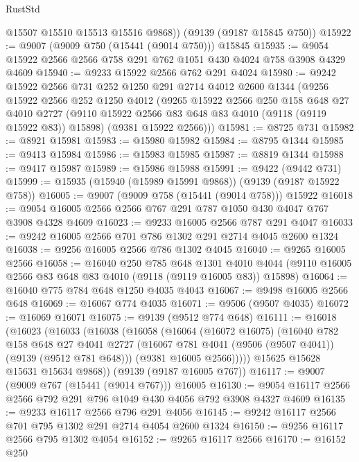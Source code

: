 \begin{lexlean}{RustStd}
\begin{coremodule}
        @15507
        @15510
        @15513
        @15516
        @9868))
    (@9139 (@9187 @15845 @750))
@15922 := @9007 (@9009 @750 (@15441 (@9014 @750))) @15845
@15935 := @9054 @15922 @2566 @2566 @758 @291 @762 @1051 @430 @4024 @758 @3908 @4329 @4609
@15940 := @9233 @15922 @2566 @762 @291 @4024
@15980 := @9242
    @15922
    @2566
    @731
    @252
    @1250
    @291
    @2714
    @4012
    @2600
    @1344
    (@9256
      @15922
      @2566
      @252
      @1250
      @4012
      (@9265
        @15922
        @2566
        @250
        @158
        @648
        @27
        @4010
        @2727
        (@9110 @15922 @2566 @83 @648 @83 @4010 (@9118 (@9119 @15922 @83)) @15898)
        (@9381 @15922 @2566)))
@15981 := @8725 @731
@15982 := @8921 @15981
@15983 := @15980 @15982
@15984 := @8795 @1344
@15985 := @9413 @15984
@15986 := @15983 @15985
@15987 := @8819 @1344
@15988 := @9417 @15987
@15989 := @15986 @15988
@15991 := @9422 (@9442 @731)
@15999 := @15935 (@15940 (@15989 @15991 @9868)) (@9139 (@9187 @15922 @758))
@16005 := @9007 (@9009 @758 (@15441 (@9014 @758))) @15922
@16018 := @9054 @16005 @2566 @2566 @767 @291 @787 @1050 @430 @4047 @767 @3908 @4328 @4609
@16023 := @9233 @16005 @2566 @787 @291 @4047
@16033 := @9242 @16005 @2566 @701 @786 @1302 @291 @2714 @4045 @2600 @1324
@16038 := @9256 @16005 @2566 @786 @1302 @4045
@16040 := @9265 @16005 @2566
@16058 := @16040
    @250
    @785
    @648
    @1301
    @4010
    @4044
    (@9110 @16005 @2566 @83 @648 @83 @4010 (@9118 (@9119 @16005 @83)) @15898)
@16064 := @16040 @775 @784 @648 @1250 @4035 @4043
@16067 := @9498 @16005 @2566 @648
@16069 := @16067 @774 @4035
@16071 := @9506 (@9507 @4035)
@16072 := @16069 @16071
@16075 := @9139 (@9512 @774 @648)
@16111 := @16018
    (@16023
      (@16033
        (@16038
          (@16058
            (@16064
              (@16072 @16075)
              (@16040
                @782
                @158
                @648
                @27
                @4041
                @2727
                (@16067 @781 @4041 (@9506 (@9507 @4041)) (@9139 (@9512 @781 @648)))
                (@9381 @16005 @2566)))))
        @15625
        @15628
        @15631
        @15634
        @9868))
    (@9139 (@9187 @16005 @767))
@16117 := @9007 (@9009 @767 (@15441 (@9014 @767))) @16005
@16130 := @9054 @16117 @2566 @2566 @792 @291 @796 @1049 @430 @4056 @792 @3908 @4327 @4609
@16135 := @9233 @16117 @2566 @796 @291 @4056
@16145 := @9242 @16117 @2566 @701 @795 @1302 @291 @2714 @4054 @2600 @1324
@16150 := @9256 @16117 @2566 @795 @1302 @4054
@16152 := @9265 @16117 @2566
@16170 := @16152
    @250

\end{coremodule}
\end{lexlean}
